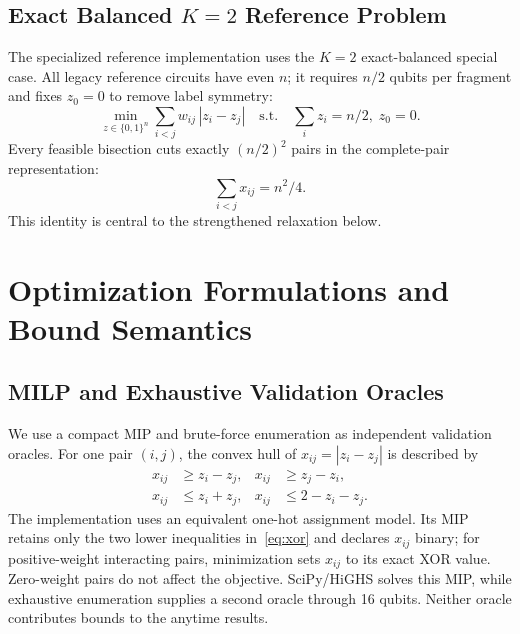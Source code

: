 \documentclass[11pt]{article}
\begin{document}
\subsection{Exact Balanced $K\!=\!2$ Reference Problem}

The specialized reference implementation uses the $K=2$ exact-balanced special case. All legacy reference circuits have even $n$; it requires $n/2$ qubits per fragment and fixes $z_0=0$ to remove label symmetry:
\begin{equation}
  \min_{z \in \{0,1\}^n} \sum_{i<j} w_{ij}\,|z_i - z_j|
  \quad \text{s.t.} \quad \textstyle\sum_i z_i = n/2,\; z_0 = 0.
  \label{eq:balanced}
\end{equation}
Every feasible bisection cuts exactly $(n/2)^2$ pairs in the complete-pair representation:
\begin{equation}
  \sum_{i<j} x_{ij} = n^2/4.
  \label{eq:cardinality}
\end{equation}
This identity is central to the strengthened relaxation below.

\section{Optimization Formulations and Bound Semantics}

\subsection{MILP and Exhaustive Validation Oracles}

We use a compact MIP and brute-force enumeration as independent validation oracles. For one pair $(i,j)$, the convex hull of $x_{ij}=|z_i-z_j|$ is described by
\begin{equation}
\begin{aligned}
  x_{ij} &\geq z_i-z_j, & x_{ij} &\geq z_j-z_i,\\
  x_{ij} &\leq z_i+z_j, & x_{ij} &\leq 2-z_i-z_j.
\end{aligned}
  \label{eq:xor}
\end{equation}
The implementation uses an equivalent one-hot assignment model. Its MIP retains only the two lower inequalities in~\eqref{eq:xor} and declares $x_{ij}$ binary; for positive-weight interacting pairs, minimization sets $x_{ij}$ to its exact XOR value. Zero-weight pairs do not affect the objective. SciPy/HiGHS solves this MIP, while exhaustive enumeration supplies a second oracle through 16 qubits. Neither oracle contributes bounds to the anytime results.
\end{document}
